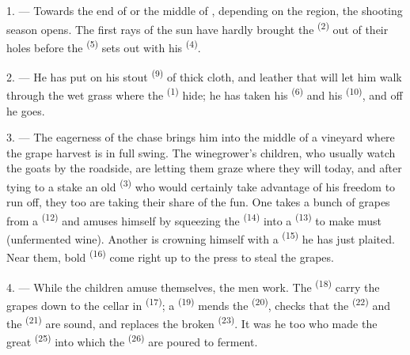 \VUsaut{6.0mm}
\VUsaut{3.6mm}

\VUsaut{1.4mm}
\VUsaut{4.0mm}

1. --- Towards the end of  or the middle of
, depending on the region, the shooting season opens.
The first rays of the sun have hardly brought the 
\textsuperscript{(2)} out of their holes before the 
\textsuperscript{(5)} sets out with his  \textsuperscript{(4)}.

2. --- He has put on his stout  \textsuperscript{(9)} of
thick cloth, and leather  that will let him walk through
the wet grass where the  \textsuperscript{(1)} hide; he has taken his
 \textsuperscript{(6)} and his  \textsuperscript{(10)}, and
off he goes.

3. --- The eagerness of the chase brings him into the middle of a vineyard
where the grape harvest is in full swing. The winegrower's children, who
usually watch the goats by the roadside, are letting them graze where
they will today, and after tying to a stake an old 
\textsuperscript{(3)} who would certainly take advantage of his freedom to run
off, they too are taking their share of the fun. One takes a bunch of
grapes from a  \textsuperscript{(12)} and amuses himself by
squeezing the  \textsuperscript{(14)} into a 
\textsuperscript{(13)} to make must (unfermented wine). Another is crowning
himself with a  \textsuperscript{(15)} he has just plaited.
Near them, bold  \textsuperscript{(16)} come right up to the press
to steal the grapes.

4. --- While the children amuse themselves, the men work. The
 \textsuperscript{(18)} carry the grapes down to the cellar in
 \textsuperscript{(17)}; a  \textsuperscript{(19)} mends
the  \textsuperscript{(20)}, checks that the 
\textsuperscript{(22)} and the  \textsuperscript{(21)} are sound, and
replaces the broken  \textsuperscript{(23)}. It was he too who made
the great  \textsuperscript{(25)} into which the 
\textsuperscript{(26)} are poured to ferment.

